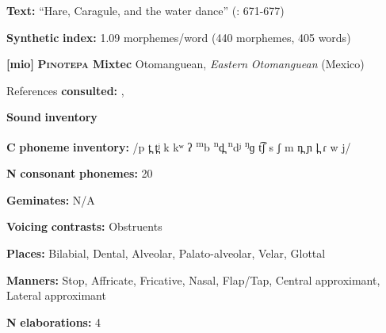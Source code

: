 \documentclass[output=paper]{langsci/langscibook}
\begin{document}
\begin{styleBody}
\textbf{Text:} “Hare, Caragule, and the water dance” (\citealt{BlackingsFabb2003}: 671-677)
\end{styleBody}

\begin{styleBody}
\textbf{Synthetic} \textbf{index:} 1.09 morphemes/word (440 morphemes, 405 words)
\end{styleBody}

\begin{styleBody}
\textbf{[mio]}   \textbf{\textsc{Pinotepa} \textbf{Mixtec}}  Otomanguean, \textit{Eastern} \textit{Otomanguean} (Mexico)
\end{styleBody}

\begin{styleBody}
References \textbf{consulted:} \citet{Bradley1971}, \citet{Costello2014}
\end{styleBody}

\begin{styleBody}
\textbf{Sound} \textbf{inventory}
\end{styleBody}

\begin{styleBody}
\textbf{C} \textbf{phoneme} \textbf{inventory:} /p t̪ t̪ʲ k kʷ ʔ \textsuperscript{m}b \textsuperscript{n}d̪ \textsuperscript{n}dʲ \textsuperscript{ŋ}ɡ t͡ʃ s ʃ m n̪ ɲ l̪ ɾ w j/
\end{styleBody}

\begin{styleBody}
\textbf{N} \textbf{consonant} \textbf{phonemes:} 20
\end{styleBody}

\begin{styleBody}
\textbf{Geminates:} N/A
\end{styleBody}

\begin{styleBody}
\textbf{Voicing} \textbf{contrasts:} Obstruents
\end{styleBody}

\begin{styleBody}
\textbf{Places:} Bilabial, Dental, Alveolar, Palato-alveolar, Velar, Glottal
\end{styleBody}

\begin{styleBody}
\textbf{Manners:} Stop, Affricate, Fricative, Nasal, Flap/Tap, Central approximant, Lateral approximant
\end{styleBody}

\begin{styleBody}
\textbf{N} \textbf{elaborations:} 4
\end{styleBody}
\end{document}
